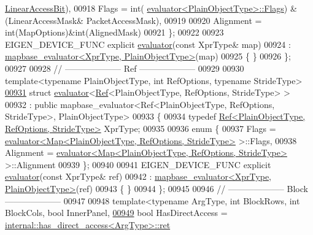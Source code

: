\begin{DoxyCode}
      \hyperlink{group__flags_ga4b983a15d57cd55806df618ac544d09e}{LinearAccessBit}),
00918     Flags = int( \hyperlink{struct_eigen_1_1internal_1_1evaluator}{evaluator<PlainObjectType>::Flags}) & (LinearAccessMask&
      PacketAccessMask),
00919     
00920     Alignment = \textcolor{keywordtype}{int}(MapOptions)&int(AlignedMask)
00921   \};
00922 
00923   EIGEN\_DEVICE\_FUNC \textcolor{keyword}{explicit} \hyperlink{struct_eigen_1_1internal_1_1evaluator}{evaluator}(\textcolor{keyword}{const} XprType& map)
00924     : \hyperlink{struct_eigen_1_1internal_1_1mapbase__evaluator}{mapbase\_evaluator<XprType, PlainObjectType>}(map) 
00925   \{ \}
00926 \};
00927 
00928 \textcolor{comment}{// -------------------- Ref --------------------}
00929 
00930 \textcolor{keyword}{template}<\textcolor{keyword}{typename} PlainObjectType, \textcolor{keywordtype}{int} RefOptions, \textcolor{keyword}{typename} Str\textcolor{keywordtype}{id}eType> 
\hyperlink{struct_eigen_1_1internal_1_1evaluator_3_01_ref_3_01_plain_object_type_00_01_ref_options_00_01_stride_type_01_4_01_4}{00931} \textcolor{keyword}{struct }\hyperlink{struct_eigen_1_1internal_1_1evaluator}{evaluator}<\hyperlink{group___core___module_class_eigen_1_1_ref}{Ref}<PlainObjectType, RefOptions, StrideType> >
00932   : \textcolor{keyword}{public} mapbase\_evaluator<Ref<PlainObjectType, RefOptions, StrideType>, PlainObjectType>
00933 \{
00934   \textcolor{keyword}{typedef} \hyperlink{group___core___module_class_eigen_1_1_ref}{Ref<PlainObjectType, RefOptions, StrideType>} XprType;
00935   
00936   \textcolor{keyword}{enum} \{
00937     Flags = \hyperlink{struct_eigen_1_1internal_1_1evaluator}{evaluator<Map<PlainObjectType, RefOptions, StrideType>}
       >::Flags,
00938     Alignment = \hyperlink{struct_eigen_1_1internal_1_1evaluator}{evaluator<Map<PlainObjectType, RefOptions, StrideType>}
       >::Alignment
00939   \};
00940 
00941   EIGEN\_DEVICE\_FUNC \textcolor{keyword}{explicit} \hyperlink{struct_eigen_1_1internal_1_1evaluator}{evaluator}(\textcolor{keyword}{const} XprType& ref)
00942     : \hyperlink{struct_eigen_1_1internal_1_1mapbase__evaluator}{mapbase\_evaluator<XprType, PlainObjectType>}(ref) 
00943   \{ \}
00944 \};
00945 
00946 \textcolor{comment}{// -------------------- Block --------------------}
00947 
00948 \textcolor{keyword}{template}<\textcolor{keyword}{typename} ArgType, \textcolor{keywordtype}{int} BlockRows, \textcolor{keywordtype}{int} BlockCols, \textcolor{keywordtype}{bool} InnerPanel,
\hyperlink{struct_eigen_1_1internal_1_1block__evaluator}{00949}          \textcolor{keywordtype}{bool} HasDirectAccess = \hyperlink{struct_eigen_1_1internal_1_1has__direct__access}{internal::has\_direct\_access<ArgType>::ret}

\end{DoxyCode}
